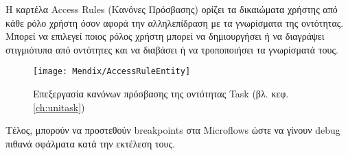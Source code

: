                 Η καρτέλα Access Rules (Κανόνες Πρόσβασης) ορίζει τα δικαιώματα χρήστης από κάθε ρόλο χρήστη όσον αφορά την αλληλεπίδραση με τα γνωρίσματα της οντότητας. Μπορεί να επιλεγεί ποιος ρόλος χρήστη μπορεί να δημιουργήσει ή να διαγράψει στιγμιότυπα από οντότητες και να διαβάσει ή να τροποποιήσει τα γνωρίσματά τους.

                \begin{figure}[h!] \noindent \centering
                        \texttt{[image: Mendix/AccessRuleEntity]}
                        \caption{\centering Επεξεργασία κανόνων πρόσβασης της οντότητας Task (βλ. κεφ. \ref{ch:unitask})}
                \end{figure}

                Τέλος, μπορούν να προστεθούν breakpoints στα Microflows ώστε να γίνουν debug πιθανά σφάλματα κατά την εκτέλεση τους.
